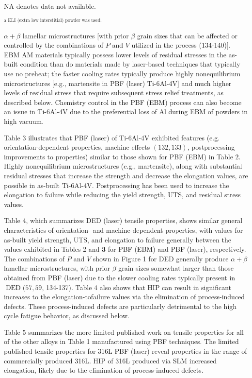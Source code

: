 \documentclass[10pt]{article}
\begin{document}
NA denotes data not available.

${ }^{\text {a ELI (extra low interstitial) powder was used. }}$

$\alpha+\beta$ lamellar microstructures [with prior $\beta$ grain sizes that can be affected or controlled by the combinations of $P$ and $V$ utilized in the process (134-140)]. EBM AM materials typically possess lower levels of residual stresses in the as-built condition than do materials made by laser-based techniques that typically use no preheat; the faster cooling rates typically produce highly nonequilibrium microstructures [e.g., martensite in PBF (laser) Ti-6Al-4V] and much higher levels of residual stress that require subsequent stress relief treatments, as described below. Chemistry control in the PBF (EBM) process can also become an issue in Ti-6Al-4V due to the preferential loss of $\mathrm{Al}$ during EBM of powders in high vacuum.

Table 3 illustrates that PBF (laser) of Ti-6Al-4V exhibited features (e.g. orientation-dependent properties, machine effects $(132,133)$, postprocessing improvements to properties) similar to those shown for PBF (EBM) in Table 2. Highly nonequilibrium microstructures (e.g., martensite), along with substantial residual stresses that increase the strength and decrease the elongation values, are possible in as-built Ti-6Al-4V. Postprocessing has been used to increase the elongation to failure while reducing the yield strength, UTS, and residual stress values.

Table 4, which summarizes DED (laser) tensile properties, shows similar general characteristics of orientation- and machine-dependent properties, with values for as-built yield strength, UTS, and elongation to failure generally between the values exhibited in Tables 2 and $\mathbf{3}$ for PBF (EBM) and PBF (laser), respectively. The combinations of $P$ and $V$ shown in Figure 1 for DED generally produce $\alpha+\beta$ lamellar microstructures, with prior $\beta$ grain sizes somewhat larger than those obtained from PBF (laser) due to the slower cooling rates typically present in $\operatorname{DED}(57,59$, 134-137). Table 4 also shows that HIP can result in significant increases to the elongation-tofailure values via the elimination of process-induced defects. These process-induced defects are particularly detrimental to the high cycle fatigue behavior, as discussed below.

Table 5 summarizes the more limited published work on tensile properties for all of the other alloys in Table 1 manufactured using PBF techniques. The limited published tensile properties for 316L PBF (laser) reveal properties in the range of commercially produced 316L. HIP of 316L produced via SLM increased elongation, likely due to the elimination of process-induced defects.
\end{document}
